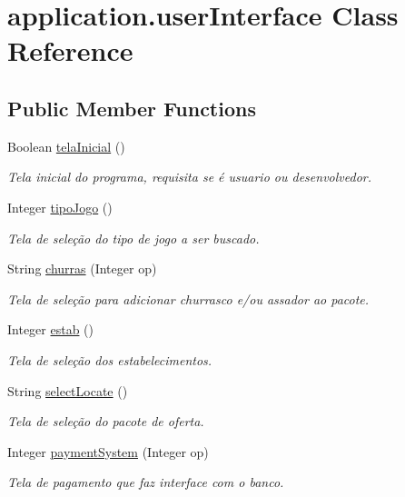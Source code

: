 \hypertarget{classapplication_1_1user_interface}{}\section{application.\+user\+Interface Class Reference}
\label{classapplication_1_1user_interface}
\subsection*{Public Member Functions}
\begin{DoxyCompactItemize}
\item 
Boolean \mbox{\hyperlink{classapplication_1_1user_interface_a8741d121e8719f84ff8516e2b7c0174f}{tela\+Inicial}} ()
\begin{DoxyCompactList}\small\item\em Tela inicial do programa, requisita se é usuario ou desenvolvedor. \end{DoxyCompactList}\item 
Integer \mbox{\hyperlink{classapplication_1_1user_interface_aa764b8abf20ccd252d8a7afaf7d68644}{tipo\+Jogo}} ()
\begin{DoxyCompactList}\small\item\em Tela de seleção do tipo de jogo a ser buscado. \end{DoxyCompactList}\item 
String \mbox{\hyperlink{classapplication_1_1user_interface_acd3a41cd8b5810b742d9e82ed21c9e86}{churras}} (Integer op)
\begin{DoxyCompactList}\small\item\em Tela de seleção para adicionar churrasco e/ou assador ao pacote. \end{DoxyCompactList}\item 
Integer \mbox{\hyperlink{classapplication_1_1user_interface_a74b097135baddace392249524e2f859a}{estab}} ()
\begin{DoxyCompactList}\small\item\em Tela de seleção dos estabelecimentos. \end{DoxyCompactList}\item 
String \mbox{\hyperlink{classapplication_1_1user_interface_aaac32b9a83abf1c16aac600e39f2a6e8}{select\+Locate}} ()
\begin{DoxyCompactList}\small\item\em Tela de seleção do pacote de oferta. \end{DoxyCompactList}\item 
Integer \mbox{\hyperlink{classapplication_1_1user_interface_a52fe91e8ac2b04a9ca5e8194f83b2b26}{payment\+System}} (Integer op)
\begin{DoxyCompactList}\small\item\em Tela de pagamento que faz interface com o banco. \end{DoxyCompactList}\end{DoxyCompactItemize}


